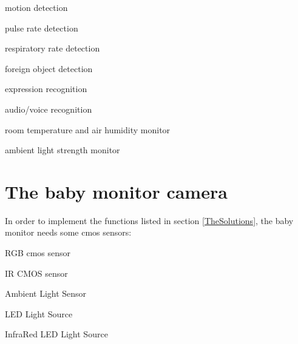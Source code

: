 \documentclass[a4paper,10pt]{report}
\begin{document}
\begin{compactitem}
\item motion detection
\end{compactitem}
\begin{compactitem}
\item pulse rate detection
\end{compactitem}
\begin{compactitem}
\item respiratory rate detection
\end{compactitem}
\begin{compactitem}
\item foreign object detection
\end{compactitem}
\begin{compactitem}
\item expression recognition
\end{compactitem}
\begin{compactitem}
\item audio/voice recognition
\end{compactitem}
\begin{compactitem}
\item room temperature and air humidity monitor
\end{compactitem}
\begin{compactitem}
\item ambient light strength monitor
\end{compactitem}

\section{The baby monitor camera}
In order to implement the functions listed in section \ref{TheSolutions}, the baby monitor needs some cmos sensors:
\begin{compactitem}
\item RGB cmos sensor
\end{compactitem}
\begin{compactitem}
\item IR CMOS sensor
\end{compactitem}
\begin{compactitem}
\item Ambient Light Sensor
\end{compactitem}
\begin{compactitem}
\item LED Light Source
\end{compactitem}
\begin{compactitem}
\item InfraRed LED Light Source
\end{compactitem}
\end{document}
